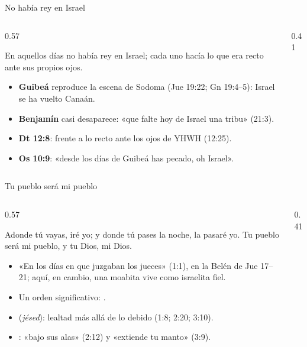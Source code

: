 \begin{frame}{No había rey en Israel}
\begin{columns}[c,onlytextwidth]
\begin{column}{0.57\textwidth}
\begin{cita}En aquellos días no había rey en Israel; cada uno hacía lo que era recto ante sus propios ojos.\end{cita}
\scriptsize
\begin{itemize}
\item \textbf{Guibeá} reproduce la escena de Sodoma (Jue 19:22; Gn 19:4--5): Israel se ha vuelto Canaán.
\item \textbf{Benjamín} casi desaparece: «que falte hoy de Israel una tribu» (21:3).
\item \textbf{Dt 12:8}:  frente a lo recto ante los ojos de YHWH (12:25).
\item \textbf{Os 10:9}: «desde los días de Guibeá has pecado, oh Israel».
\end{itemize}
\end{column}
\begin{column}{0.41\textwidth}\end{column}
\end{columns}
\end{frame}

\begin{frame}{Tu pueblo será mi pueblo}
\begin{columns}[c,onlytextwidth]
\begin{column}{0.57\textwidth}
\begin{cita}Adonde tú vayas, iré yo; y donde tú pases la noche, la pasaré yo. Tu pueblo será mi pueblo, y tu Dios, mi Dios.\end{cita}
\scriptsize
\begin{itemize}
\item «En los días en que juzgaban los jueces» (1:1), en la Belén de Jue 17--21; aquí, en cambio, una moabita vive como israelita fiel.
\item Un orden significativo: .
\item {} (\emph{jésed}): lealtad más allá de lo debido (1:8; 2:20; 3:10).
\item {}: «bajo sus alas» (2:12) y «extiende tu manto» (3:9).
\end{itemize}
\end{column}
\begin{column}{0.41\textwidth}\end{column}
\end{columns}
\end{frame}

